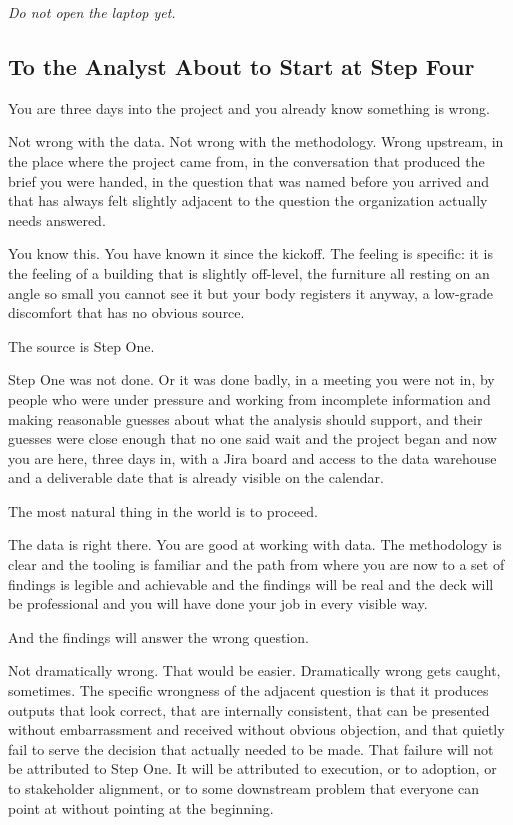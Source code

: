 \textit{Do not open the laptop yet.}

\subsection*{To the Analyst About to Start at Step Four}

You are three days into the project and you already know something is wrong.

Not wrong with the data. Not wrong with the methodology. Wrong upstream, in the place where the project came from, in the conversation that produced the brief you were handed, in the question that was named before you arrived and that has always felt slightly adjacent to the question the organization actually needs answered.

You know this. You have known it since the kickoff. The feeling is specific: it is the feeling of a building that is slightly off-level, the furniture all resting on an angle so small you cannot see it but your body registers it anyway, a low-grade discomfort that has no obvious source.

The source is Step One.

Step One was not done. Or it was done badly, in a meeting you were not in, by people who were under pressure and working from incomplete information and making reasonable guesses about what the analysis should support, and their guesses were close enough that no one said wait and the project began and now you are here, three days in, with a Jira board and access to the data warehouse and a deliverable date that is already visible on the calendar.

The most natural thing in the world is to proceed.

The data is right there. You are good at working with data. The methodology is clear and the tooling is familiar and the path from where you are now to a set of findings is legible and achievable and the findings will be real and the deck will be professional and you will have done your job in every visible way.

And the findings will answer the wrong question.

Not dramatically wrong. That would be easier. Dramatically wrong gets caught, sometimes. The specific wrongness of the adjacent question is that it produces outputs that look correct, that are internally consistent, that can be presented without embarrassment and received without obvious objection, and that quietly fail to serve the decision that actually needed to be made. That failure will not be attributed to Step One. It will be attributed to execution, or to adoption, or to stakeholder alignment, or to some downstream problem that everyone can point at without pointing at the beginning.

